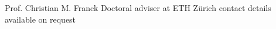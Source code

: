 


\begin{cvrefs}

    \cvref
    {Prof. Christian M. Franck} %
    {Doctoral adviser at ETH Zürich} %
    {contact details available on request} %


\end{cvrefs}
